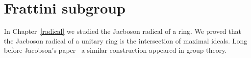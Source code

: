 \chapter{Frattini subgroup}

In Chapter~\ref{radical} we studied the Jacboson radical of a ring. We proved
that the Jacboson radical of a unitary ring is the intersection of maximal ideals. Long before 
Jacobson's paper~\cite{MR12271} a similar construction appeared in group theory. 

